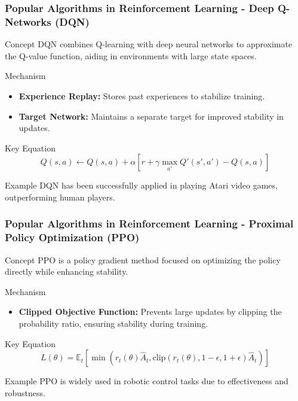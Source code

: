 \documentclass[aspectratio=169]{beamer}
\begin{document}
\begin{frame}[fragile]
    \frametitle{Popular Algorithms in Reinforcement Learning - Deep Q-Networks (DQN)}
    \begin{block}{Concept}
        DQN combines Q-learning with deep neural networks to approximate the Q-value function, aiding in environments with large state spaces.
    \end{block}
    \begin{block}{Mechanism}
        \begin{itemize}
            \item \textbf{Experience Replay:} Stores past experiences to stabilize training.
            \item \textbf{Target Network:} Maintains a separate target for improved stability in updates.
        \end{itemize}
    \end{block}
    \begin{block}{Key Equation}
        \begin{equation}
            Q(s, a) \leftarrow Q(s, a) + \alpha \left[ r + \gamma \max_{a'} Q'(s', a') - Q(s, a) \right]
        \end{equation}
    \end{block}
    \begin{block}{Example}
        DQN has been successfully applied in playing Atari video games, outperforming human players.
    \end{block}
\end{frame}

\begin{frame}[fragile]
    \frametitle{Popular Algorithms in Reinforcement Learning - Proximal Policy Optimization (PPO)}
    \begin{block}{Concept}
        PPO is a policy gradient method focused on optimizing the policy directly while enhancing stability.
    \end{block}
    \begin{block}{Mechanism}
        \begin{itemize}
            \item \textbf{Clipped Objective Function:} Prevents large updates by clipping the probability ratio, ensuring stability during training.
        \end{itemize}
    \end{block}
    \begin{block}{Key Equation}
        \begin{equation}
            L(\theta) = \mathbb{E}_t \left[ \min\left(r_t(\theta) \hat{A}_t, \text{clip}(r_t(\theta), 1 - \epsilon, 1 + \epsilon) \hat{A}_t\right) \right]
        \end{equation}
    \end{block}
    \begin{block}{Example}
        PPO is widely used in robotic control tasks due to effectiveness and robustness.
    \end{block}
\end{frame}
\end{document}
